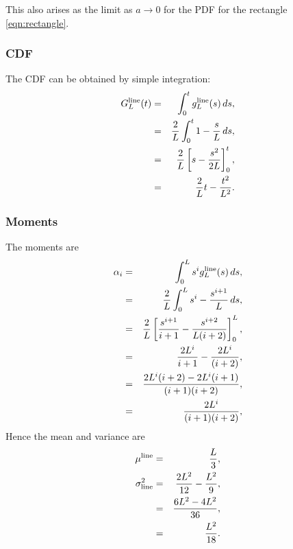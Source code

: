 This also arises as the limit as $a \rightarrow 0$ for the PDF for the
rectangle \eqref{eqn:rectangle}.

\subsubsection{CDF}

The CDF can be obtained by simple integration:
\begin{eqnarray}
  G^{\rm line}_L(t)
     & = & \int_0^t g^{\rm line}_L(s) \, ds, \nonumber \\
     & = & \frac{2}{L} \int_0^t  1-\frac{s}{L} \, ds, \nonumber \\
     & = & \frac{2}{L} \left[ s - \frac{s^2}{2L} \right]_0^t, \nonumber \\
     & = &  \frac{2}{L} t - \frac{t^2}{L^2}. \\
  \label{eq:line_cdf}  
\end{eqnarray}

\subsubsection{Moments}

The moments are
\begin{eqnarray}
  \alpha_i & = & \int_0^L s^i g^{\rm line}_L(s) \, ds, \nonumber \\
           & = & \frac{2}{L}  \int_0^L s^i- \frac{s^{i+1}}{L}  \, ds, \nonumber \\
           & = & \frac{2}{L} \left[ \frac{s^{i+1}}{i+1} - \frac{s^{i+2}}{L(i+2)} \right]_0^L, \nonumber \\
           & = & \frac{2 L^{i}}{i+1} - \frac{2 L^{i}}{(i+2)}, \nonumber \\
           & = & \frac{2 L^{i} (i+2) - 2 L^{i}(i+1)}{(i+1)(i+2)} , \nonumber \\
           & = & \frac{2 L^{i}}{(i+1)(i+2)} , \nonumber \\
  \label{eq:line_moments}
\end{eqnarray}
Hence the mean and variance are
\begin{eqnarray}
  \mu^{\rm line} & = & \frac{L}{3}, \\
  \label{eq:line_mean}
  \sigma^2_{\rm line}
      & = & \frac{2 L^{2}}{12} - \frac{L^2}{9}, \nonumber \\
      & = & \frac{6 L^{2} -4 L^2}{36}, \nonumber \\
      & = & \frac{L^{2}}{18}.
  \label{eq:line_var}
\end{eqnarray}


